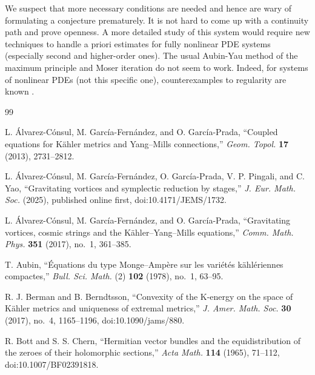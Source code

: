 \documentclass[10pt, letterpaper]{amsart}
\theoremstyle{plain}
\theoremstyle{definition}
\numberwithin{equation}{section}
\begin{document}
We suspect that more necessary conditions are needed and hence are wary of formulating a conjecture prematurely. It is not hard to come up with a continuity path and prove openness. A more detailed study of this system would require new techniques to handle a priori estimates for fully nonlinear PDE systems (especially second and higher-order ones). The usual Aubin-Yau \cite{Aubin, Yau} method of the maximum principle and Moser iteration \cite{ChenHe} do not seem to work. Indeed, for systems of nonlinear PDEs (not this specific one), counterexamples to regularity are known \cite{Necas}. 







\begin{thebibliography}{99}

 L. \'Alvarez-C\'onsul, M. Garc\'ia-Fern\'andez, and
O. Garc\'ia-Prada, ``Coupled equations for K\"ahler metrics and Yang--Mills
connections,'' \emph{Geom. Topol.} \textbf{17} (2013), 2731--2812.


 L. \'Alvarez-C\'onsul, M. Garc\'ia-Fern\'andez,
O. Garc\'ia-Prada, V. P. Pingali, and C. Yao,
``Gravitating vortices and symplectic reduction by stages,''
\emph{J. Eur. Math. Soc.} (2025), published online first,
doi:10.4171/JEMS/1732.


 L. \'Alvarez-C\'onsul, M. Garc\'ia-Fern\'andez, and
O. Garc\'ia-Prada, ``Gravitating vortices, cosmic strings and the
K\"ahler--Yang--Mills equations,'' \emph{Comm. Math. Phys.} \textbf{351}
(2017), no.~1, 361--385.


 T. Aubin,
``\'Equations du type Monge--Amp\`ere sur les vari\'et\'es k\"ahl\'eriennes
compactes,'' \emph{Bull. Sci. Math.} (2) \textbf{102} (1978), no.~1,
63--95.

 R. J. Berman and B. Berndtsson,
``Convexity of the K-energy on the space of K\"ahler metrics and uniqueness
of extremal metrics,'' \emph{J. Amer. Math. Soc.} \textbf{30} (2017),
no.~4, 1165--1196, doi:10.1090/jams/880.

 R. Bott and S. S. Chern,
``Hermitian vector bundles and the equidistribution of the zeroes of their
holomorphic sections,'' \emph{Acta Math.} \textbf{114} (1965), 71--112,
doi:10.1007/BF02391818.


\end{thebibliography}
\end{document}
